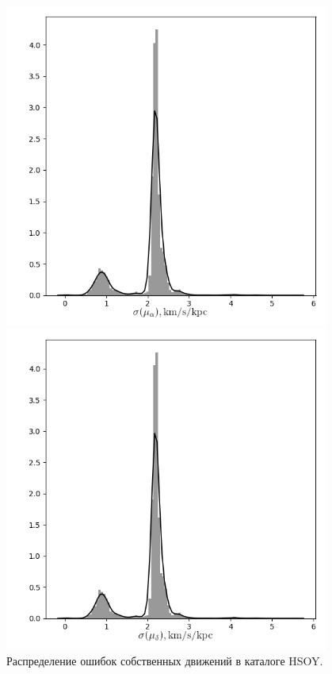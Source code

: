 \documentclass{matmex-diploma-custom}
\begin{document}
\begin{figure}[h!]
\caption{Распределение ошибок собственных движений в каталоге HSOY.}
\begin{minipage}[h]{0.49\linewidth}
        \includegraphics[width=0.95\textwidth]{../imgs/pm_ra_err_distr_hsoy.png}
\end{minipage}
\hfill
\begin{minipage}[h]{0.49\linewidth}
        \includegraphics[width=0.95\textwidth]{../imgs/pm_dec_err_distr_hsoy.png}
\end{minipage}
\end{figure}
\end{document}
